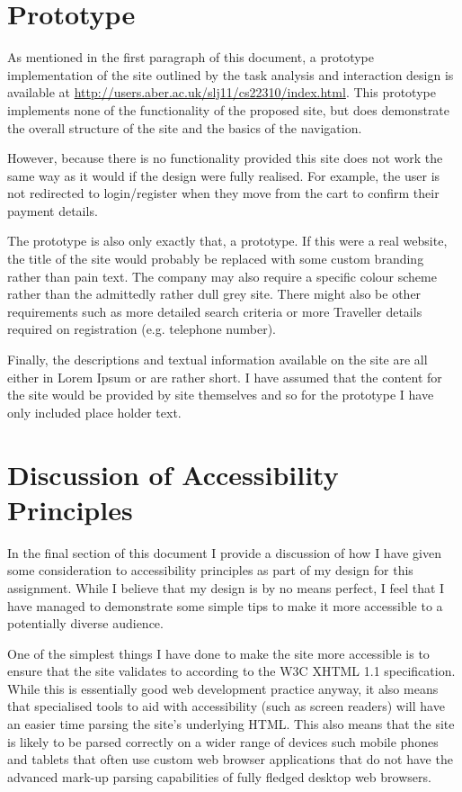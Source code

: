 \documentclass{article}
\begin{document}
\section{Prototype}
As mentioned in the first paragraph of this document, a prototype implementation of the site outlined by the task analysis and interaction design is available at \url{http://users.aber.ac.uk/slj11/cs22310/index.html}. This prototype implements none of the functionality of the proposed site, but does demonstrate the overall structure of the site and the basics of the navigation. 

However, because there is no functionality provided this site does not work the same way as it would if the design were fully realised. For example, the user is not redirected to login/register when they move from the cart to confirm their payment details.

The prototype is also only exactly that, a prototype. If this were a real website, the title of the site would probably be replaced with some custom branding rather than pain text. The company may also require a specific colour scheme rather than the admittedly rather dull grey site. There might also be other requirements such as more detailed search criteria or more Traveller details required on registration (e.g. telephone number). 

Finally, the descriptions and textual information available on the site are all either in Lorem Ipsum or are rather short. I have assumed that the content for the site would be provided by site themselves and so for the prototype I have only included place holder text.

\clearpage

\section{Discussion of Accessibility Principles}
In the final section of this document I provide a discussion of how I have given some consideration to accessibility principles as part of my design for this assignment. While I believe that my design is by no means perfect, I feel that I have managed to demonstrate some simple tips to make it more accessible to a potentially diverse audience.

One of the simplest things I have done to make the site more accessible is to ensure that the site validates to according to the W3C XHTML 1.1 specification. While this is essentially good web development practice anyway, it also means that specialised tools to aid with accessibility (such as screen readers) will have an easier time parsing the site's underlying HTML. This also means that the site is likely to be parsed correctly on a wider range of devices such mobile phones and tablets that often use custom web browser applications that do not have the advanced mark-up parsing capabilities of fully fledged desktop web browsers.
\end{document}
